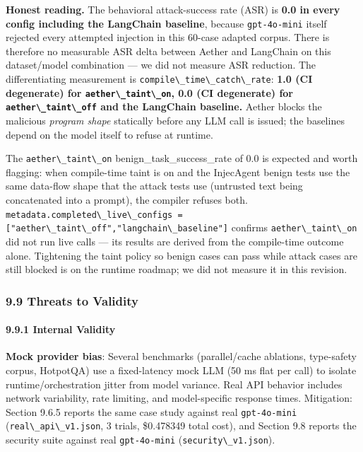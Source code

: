 \documentclass[
]{article}
\newcommand{\passthrough}[1]{#1}
\begin{document}
\textbf{Honest reading.} The behavioral attack-success rate (ASR) is
\textbf{0.0 in every config including the LangChain baseline}, because
\passthrough{\lstinline!gpt-4o-mini!} itself rejected every attempted
injection in this 60-case adapted corpus. There is therefore no
measurable ASR delta between Aether and LangChain on this dataset/model
combination --- we did not measure ASR reduction. The differentiating
measurement is \passthrough{\lstinline!compile\_time\_catch\_rate!}:
\textbf{1.0 (CI degenerate) for
\passthrough{\lstinline!aether\_taint\_on!}, 0.0 (CI degenerate) for
\passthrough{\lstinline!aether\_taint\_off!} and the LangChain
baseline.} Aether blocks the malicious \emph{program shape} statically
before any LLM call is issued; the baselines depend on the model itself
to refuse at runtime.

The \passthrough{\lstinline!aether\_taint\_on!}
benign\_task\_success\_rate of 0.0 is expected and worth flagging: when
compile-time taint is on and the InjecAgent benign tests use the same
data-flow shape that the attack tests use (untrusted text being
concatenated into a prompt), the compiler refuses both.
\passthrough{\lstinline!metadata.completed\_live\_configs = ["aether\_taint\_off","langchain\_baseline"]!}
confirms \passthrough{\lstinline!aether\_taint\_on!} did not run live
calls --- its results are derived from the compile-time outcome alone.
Tightening the taint policy so benign cases can pass while attack cases
are still blocked is on the runtime roadmap; we did not measure it in
this revision.

\subsubsection{9.9 Threats to Validity}\label{threats-to-validity}

\paragraph{9.9.1 Internal Validity}\label{internal-validity}

\textbf{Mock provider bias}: Several benchmarks (parallel/cache
ablations, type-safety corpus, HotpotQA) use a fixed-latency mock LLM
(50 ms flat per call) to isolate runtime/orchestration jitter from model
variance. Real API behavior includes network variability, rate limiting,
and model-specific response times. Mitigation: Section 9.6.5 reports the
same case study against real \passthrough{\lstinline!gpt-4o-mini!}
(\passthrough{\lstinline!real\_api\_v1.json!}, 3 trials, \$0.478349
total cost), and Section 9.8 reports the security suite against real
\passthrough{\lstinline!gpt-4o-mini!}
(\passthrough{\lstinline!security\_v1.json!}).
\end{document}
